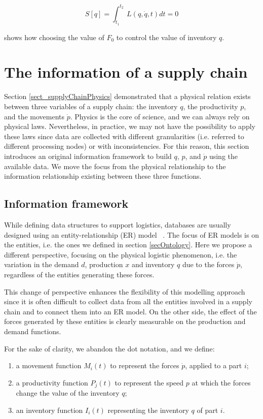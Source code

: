 \begin{equation}
S\left[q\right]=\int_{t_1}^{t_2}{\ L(q,\dot{q},t)dt}=0
\label{eq_physics4}
\end{equation}

\cite{Spearman2014} shows how choosing the value of $F_0$ to control the value of inventory $q$.


\section{The information of a supply chain}
Section \ref{sect_supplyChainPhysics} demonstrated that a physical relation exists between three variables of a supply chain: the inventory $q$, the productivity $p$, and the movements $\dot{p}$. Physics is the core of science, and we can always rely on physical laws. Nevertheless, in practice, we may not have the possibility to apply these laws since data are collected with different granularities (i.e. referred to different processing nodes) or with inconsistencies. For this reason, this section introduces an original information framework to build $q$, $p$, and $\dot{p}$ using the available data. We move the focus from the physical relationship to the information relationship existing between these three functions.

\subsection{Information framework} \label{secInfoFramework}
While defining data structures to support logistics, databases are usually designed using an entity-relationship (ER) model ~\cite{Lake2013}. The focus of ER models is on the entities, i.e. the ones we defined in section \ref{secOntology}. Here we propose a different perspective, focusing on the physical logistic phenomenon, i.e. the variation in the demand $d$, production $x$ and inventory $q$ due to the forces $\dot{p}$, regardless of the entities generating these forces.\par

This change of perspective enhances the flexibility of this modelling approach since it is often difficult to collect data from all the entities involved in a supply chain and to connect them into an ER model. On the other side, the effect of the forces generated by these entities is clearly measurable on the production and demand functions.

For the sake of clarity, we abandon the dot notation, and we define:
\begin{enumerate}
    \item a movement function $M_i(t)$ to represent the forces $\dot{p}$, applied to a part $i$;
    \item a productivity function  $P_j(t)$ to represent the speed $p$ at which the forces change the value of the inventory $q$;
    \item an inventory function $I_i\left(t\right)$ representing the inventory $q$ of part $i$.
\end{enumerate}

